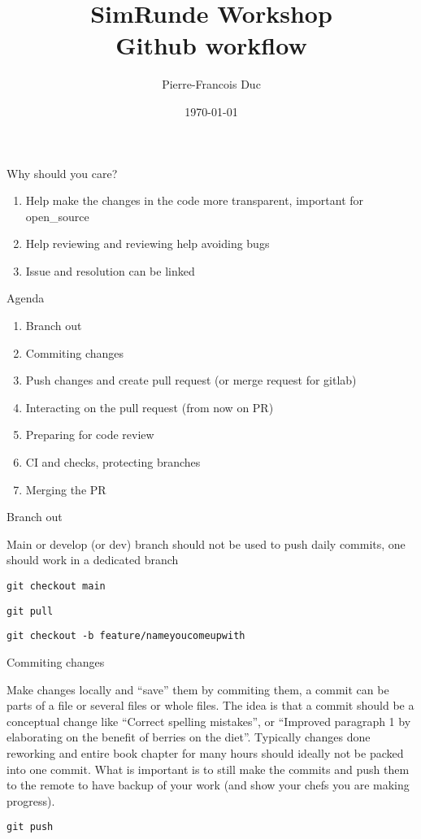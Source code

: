 \documentclass{beamer}
\title[Yo]{\textbf{SimRunde Workshop} \\ Github workflow}
\author{Pierre-Francois Duc\\
}
\institute{Reiner Lemoine Institut}
\date{\today}
\begin{document}
\begin{frame}
  \titlepage
\end{frame}

\begin{frame}{Why should you care?}

 \begin{enumerate}
  \item Help make the changes in the code more transparent, important for open\_source
  \item Help reviewing and reviewing help avoiding bugs
  \item Issue and resolution can be linked
 \end{enumerate}

\end{frame}

\begin{frame}{Agenda}
 \begin{enumerate}
  \item Branch out
  \item Commiting changes
  \item Push changes and create pull request (or merge request for gitlab)
  \item Interacting on the pull request (from now on PR) 
  \item Preparing for code review
  \item CI and checks, protecting branches
  \item Merging the PR
 \end{enumerate}

\end{frame}

\begin{frame}{Branch out}

Main or develop (or dev) branch should not be used to push daily commits, one should work in a dedicated branch


{\tt git checkout main}

{\tt git pull}

{\tt git checkout -b feature/nameyoucomeupwith}


\end{frame}

\begin{frame}{Commiting changes}

Make changes locally and ``save'' them by commiting them, a commit can be parts of a file or several files or whole files. The idea is that a commit should be a conceptual change like ``Correct spelling mistakes'', or ``Improved paragraph 1 by elaborating on the benefit of berries on the diet''. Typically changes done reworking and entire book chapter for many hours should ideally not be packed into one commit. What is important is to still make the commits and push them to the remote to have backup of your work (and show your chefs you are making progress).

{\tt git push} 

\end{frame}
\end{document}

